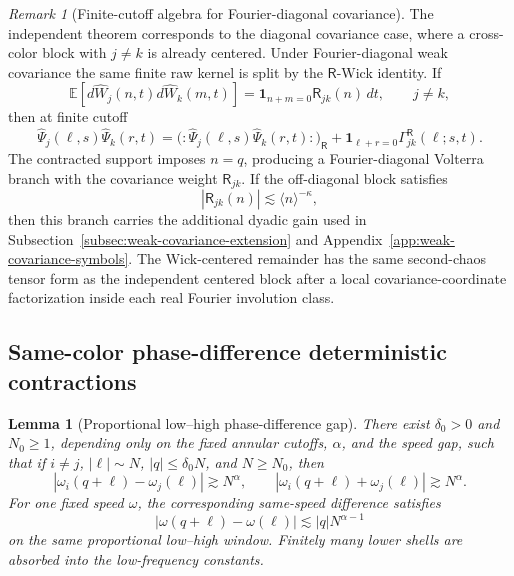 \documentclass[10pt]{amsart}
\numberwithin{equation}{section}
\theoremstyle{plain}
\newtheorem{lemma}[theorem]{Lemma}
\theoremstyle{definition}
\theoremstyle{remark}
\newtheorem{remark}[theorem]{Remark}
\newcommand{\E}{\mathbb{E}}
\begin{document}
\begin{remark}[Finite-cutoff algebra for Fourier-diagonal covariance]\label{rem:weakly-correlated-colors}
The independent theorem corresponds to the diagonal covariance case, where a cross-color block with \(j\ne k\) is already centered.  Under Fourier-diagonal weak covariance the same finite raw kernel is split by the \(\mathsf R\)-Wick identity.  If
\[
  \E[d\widehat W_j(n,t)d\widehat W_k(m,t)]
  =\mathbf 1_{n+m=0}\mathsf R_{jk}(n)\,dt,
  \qquad j\ne k,
\]
then at finite cutoff
\[
  \widehat\Psi_j(\ell,s)\widehat\Psi_k(r,t)
  =\bigl(:\widehat\Psi_j(\ell,s)\widehat\Psi_k(r,t):\bigr)_{\mathsf R}
  +\mathbf 1_{\ell+r=0}\Gamma_{jk}^{\mathsf R}(\ell;s,t).
\]
The contracted support imposes \(n=q\), producing a Fourier-diagonal Volterra branch with the covariance weight \(\mathsf R_{jk}\).  If the off-diagonal block satisfies
\[
  |\mathsf R_{jk}(n)|\lesssim \langle n\rangle^{-\kappa},
\]
then this branch carries the additional dyadic gain used in Subsection~\ref{subsec:weak-covariance-extension} and Appendix~\ref{app:weak-covariance-symbols}.  The Wick-centered remainder has the same second-chaos tensor form as the independent centered block after a local covariance-coordinate factorization inside each real Fourier involution class.
\end{remark}

\subsection{Same-color phase-difference deterministic contractions}\label{subsec:same-color-det}

\begin{lemma}[Proportional low--high phase-difference gap]\label{lem:speed-gap}
There exist $\delta_0>0$ and $N_0\ge1$, depending only on the fixed annular cutoffs, $\alpha$, and the speed gap, such that if $i\ne j$, $|\ell|\sim N$, $|q|\le\delta_0N$, and $N\ge N_0$, then
\begin{equation}\label{eq:speed-gap}
 |\omega_i(q+\ell)-\omega_j(\ell)|\gtrsim N^\alpha,
 \qquad
 |\omega_i(q+\ell)+\omega_j(\ell)|\gtrsim N^\alpha.
\end{equation}
For one fixed speed $\omega$, the corresponding same-speed difference satisfies
\begin{equation}\label{eq:same-speed-comparison}
        |\omega(q+\ell)-\omega(\ell)|\lesssim |q|N^{\alpha-1}
\end{equation}
on the same proportional low--high window.  Finitely many lower shells are absorbed into the low-frequency constants.
\end{lemma}
\end{document}
